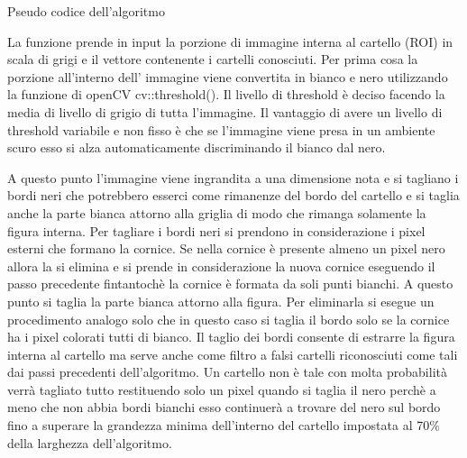 		\begin{algorithm}[htp]
		\SetAlgoLined
		\caption{Pseudo codice dell'algoritmo}
		\end{algorithm}

		La funzione prende in input la porzione di immagine interna al cartello (ROI) in scala di grigi e il vettore contenente i cartelli conosciuti. Per prima cosa la porzione all'interno dell' immagine viene convertita in bianco e nero utilizzando la funzione di openCV cv::threshold(). Il livello di threshold è deciso facendo la media di livello di grigio di tutta l'immagine. Il vantaggio di avere un livello di threshold variabile e non fisso è che se l'immagine viene presa in un ambiente scuro esso si alza automaticamente discriminando il bianco dal nero.
		
		A questo punto l'immagine viene ingrandita a una dimensione nota e si tagliano i bordi neri che potrebbero esserci come rimanenze del bordo del cartello e si taglia anche la parte bianca attorno alla griglia di modo che rimanga solamente la figura interna. Per tagliare i bordi neri si prendono in considerazione i pixel esterni che formano la cornice. Se nella cornice è presente almeno un pixel nero allora la si elimina e si prende in considerazione la nuova cornice eseguendo il passo precedente fintantochè la cornice è formata da soli punti bianchi. A questo punto si taglia la parte bianca attorno alla figura. Per eliminarla si esegue un procedimento analogo solo che in questo caso si taglia il bordo solo se la cornice ha i pixel colorati tutti di bianco. Il taglio dei bordi consente di estrarre la figura interna al cartello ma serve anche come filtro a falsi cartelli riconosciuti come tali dai passi precedenti dell'algoritmo. Un cartello non è tale con molta probabilità verrà tagliato  tutto restituendo solo un pixel quando si taglia il nero perchè a meno che non abbia bordi bianchi esso continuerà a trovare del nero sul bordo fino a superare la grandezza minima dell'interno del cartello impostata al 70\% della larghezza dell'algoritmo.
		
